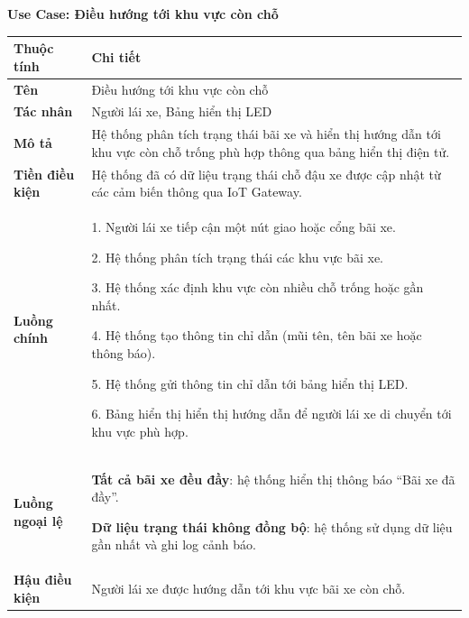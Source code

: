 \noindent \textbf{Use Case: Điều hướng tới khu vực còn chỗ} \\
\renewcommand{\arraystretch}{1.6}
\begin{xltabular}{\textwidth}{|l|X|}
\hline
\textbf{Thuộc tính} & \textbf{Chi tiết} \\
\hline
\textbf{Tên} & Điều hướng tới khu vực còn chỗ  \\
\hline
\textbf{Tác nhân} & Người lái xe, Bảng hiển thị LED \\
\hline
\textbf{Mô tả} & Hệ thống phân tích trạng thái bãi xe và hiển thị hướng dẫn tới khu vực còn chỗ trống phù hợp thông qua bảng hiển thị điện tử. \\
\hline
\textbf{Tiền điều kiện} & Hệ thống đã có dữ liệu trạng thái chỗ đậu xe được cập nhật từ các cảm biến thông qua IoT Gateway. \\
\hline
\textbf{Luồng chính} & 
1. Người lái xe tiếp cận một nút giao hoặc cổng bãi xe. 

2. Hệ thống phân tích trạng thái các khu vực bãi xe. 

3. Hệ thống xác định khu vực còn nhiều chỗ trống hoặc gần nhất. 

4. Hệ thống tạo thông tin chỉ dẫn (mũi tên, tên bãi xe hoặc thông báo). 

5. Hệ thống gửi thông tin chỉ dẫn tới bảng hiển thị LED. 

6. Bảng hiển thị hiển thị hướng dẫn để người lái xe di chuyển tới khu vực phù hợp.
\\
\hline

\textbf{Luồng ngoại lệ} & 
\textbf{Tất cả bãi xe đều đầy}: hệ thống hiển thị thông báo “Bãi xe đã đầy”. 

\textbf{Dữ liệu trạng thái không đồng bộ}: hệ thống sử dụng dữ liệu gần nhất và ghi log cảnh báo.
\\
\hline

\textbf{Hậu điều kiện} & Người lái xe được hướng dẫn tới khu vực bãi xe còn chỗ. \\
\hline
\end{xltabular}

